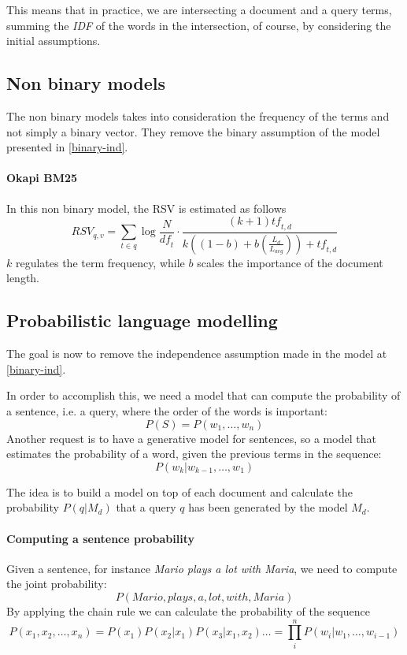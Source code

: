 This means that in practice, we are intersecting a document and a query terms, 
summing the \emph{IDF} of the words in the intersection, of course, by
considering the initial assumptions.

\subsection{Non binary models}
The non binary models takes into consideration the frequency of the terms 
and not simply a binary vector. They remove the binary assumption 
of the model presented in \vref{binary-ind}.

\paragraph{Okapi BM25}
In this non binary model, the RSV is estimated as follows
$$\mathit{RSV}_{q,v} = \sum_{t \in q}\log \frac{N}{\mathit{df}_t} 
\cdot \frac{(k+1)\mathit{tf}_{t,d}}{k((1-b) + b (\frac{L_d}{L_{\mathit{avg}}})) 
+ \mathit{tf}_{t,d}}$$
$k$ regulates the term frequency, while $b$ scales the importance of 
the document length.

\subsection{Probabilistic language modelling}
\label{problangmodel}
The goal is now to remove the independence assumption made in the model 
at \vref{binary-ind}.

In order to accomplish this, we need a model that can compute the probability 
of a sentence, i.e. a query, where the order of the words is important:
$$P(S) = P(w_1, \dots, w_n)$$
Another request is to have a generative model for sentences, so a model 
that estimates the probability of a word, given the previous terms in the 
sequence:
$$P(w_k | w_{k-1}, \dots, w_1)$$

The idea is to build a model on top of each document and calculate 
the probability $P(q|M_d)$ that a query $q$ has been generated by the model 
$M_d$.

\paragraph{Computing a sentence probability}
Given a sentence, for instance \emph{Mario plays a lot with Maria}, 
we need to compute the joint probability:
$$P(\mathit{Mario}, \mathit{plays}, \mathit{a}, \mathit{lot}, \mathit{with}, \mathit{Maria})$$
By applying the chain rule we can calculate the probability of the sequence
$$P(x_1, x_2, \dots, x_n) = P(x_1)P(x_2|x_1)P(x_3|x_1,x_2)\dots = \prod_i^nP(w_i|w_1, \dots, w_{i-1})$$ 


